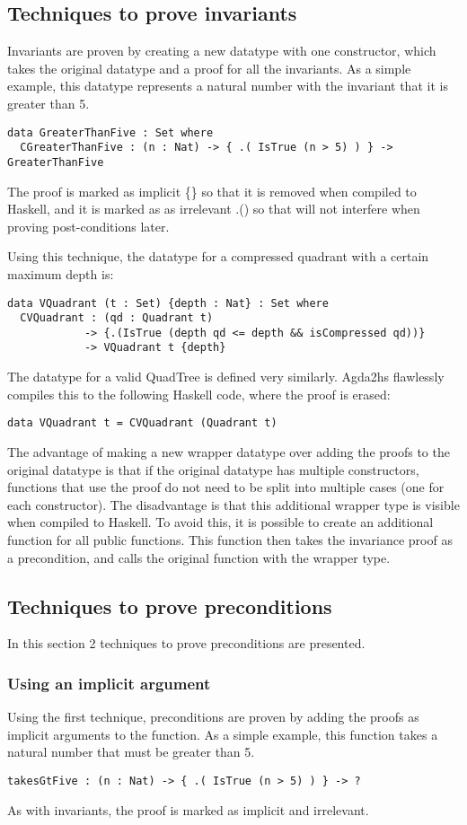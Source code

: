 \subsection{Techniques to prove invariants}
Invariants are proven by creating a new datatype with one constructor, which takes the original datatype and a proof for all the invariants. As a simple example, this datatype represents a natural number with the invariant that it is greater than 5.
\begin{verbatim}
data GreaterThanFive : Set where
  CGreaterThanFive : (n : Nat) -> { .( IsTrue (n > 5) ) } -> GreaterThanFive
\end{verbatim}
The proof is marked as implicit \{\} so that it is removed when compiled to Haskell, and it is marked as as irrelevant .() so that will not interfere when proving post-conditions later. 

Using this technique, the datatype for a compressed quadrant with a certain maximum depth is: 
\begin{verbatim}
data VQuadrant (t : Set) {depth : Nat} : Set where
  CVQuadrant : (qd : Quadrant t) 
            -> {.(IsTrue (depth qd <= depth && isCompressed qd))} 
            -> VQuadrant t {depth}
\end{verbatim}
The datatype for a valid QuadTree is defined very similarly. Agda2hs flawlessly compiles this to the following Haskell code, where the proof is erased:
\begin{verbatim}
data VQuadrant t = CVQuadrant (Quadrant t)
\end{verbatim}

The advantage of making a new wrapper datatype over adding the proofs to the original datatype is that if the original datatype has multiple constructors, functions that use the proof do not need to be split into multiple cases (one for each constructor). The disadvantage is that this additional wrapper type is visible when compiled to Haskell. To avoid this, it is possible to create an additional function for all public functions. This function then takes the invariance proof as a precondition, and calls the original function with the wrapper type. 

\subsection{Techniques to prove preconditions}
In this section 2 techniques to prove preconditions are presented.

\subsubsection{Using an implicit argument}
Using the first technique, preconditions are proven by adding the proofs as implicit arguments to the function.
As a simple example, this function takes a natural number that must be greater than 5.
\begin{verbatim}
takesGtFive : (n : Nat) -> { .( IsTrue (n > 5) ) } -> ?
\end{verbatim}
As with invariants, the proof is marked as implicit and irrelevant. 

